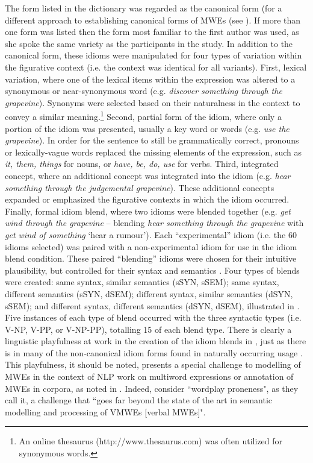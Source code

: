 \documentclass[output=paper
,modfonts
,nonflat]{langsci/langscibook}
\begin{document}
The form listed in the dictionary was regarded as the canonical form (for a different approach to establishing canonical forms of MWEs (see ). If more than one form was listed then the form most familiar to the first author was used, as she spoke the same variety as the participants in the study. In addition to the canonical form, these idioms were manipulated for four types of variation within the figurative context (i.e. the context was identical for all variants). First, lexical variation, where one of the lexical items within the expression was altered to a synonymous or near-synonymous word (e.g. \textit{discover something through the grapevine}). Synonyms were selected based on their naturalness in the context to convey a similar meaning.\footnote{An online thesaurus (http://www.thesaurus.com) was often utilized for synonymous words.} Second, partial form of the idiom, where only a portion of the idiom was presented, usually a key word or words (e.g. \textit{use the grapevine}). In order for the sentence to still be grammatically correct, pronouns or lexically-vague words replaced the missing elements of the expression, such as \textit{it, them, things} for nouns, or \textit{have, be, do, use} for verbs. Third, integrated concept, where an additional concept was integrated into the idiom (e.g. \textit{hear something through the judgemental grapevine}). These additional concepts expanded or emphasized the figurative contexts in which the idiom occurred. Finally, formal idiom blend, where two idioms were blended together (e.g. \textit{get wind through the grapevine} -- blending \textit{hear something through the grapevine} with \textit{get wind of something} `hear a rumour'). Each ``experimental'' idiom (i.e. the 60 idioms selected) was paired with a non-experimental idiom for use in the idiom blend condition. These paired ``blending'' idioms were chosen for their intuitive plausibility, but controlled for their syntax and semantics \citep{CuttingBock1997}. Four types of blends were created: same syntax, similar semantics (sSYN, sSEM); same syntax, different semantics (sSYN, dSEM); different syntax, similar semantics (dSYN, sSEM); and different syntax, different semantics (dSYN, dSEM), illustrated in . Five instances of each type of blend occurred with the three syntactic types (i.e. V-NP, V-PP, or V-NP-PP), totalling 15 of each blend type. There is clearly a linguistic playfulness at work in the creation of the idiom blends in , just as there is in many of the non-canonical idiom forms found in naturally occurring usage \citep[cf.][]{Moon1998,Duffley2013}. This playfulness, it should be noted, presents a special challenge to modelling of MWEs in the context of NLP work on multiword expressions or annotation of MWEs in corpora, as noted in . Indeed,  consider ``wordplay proneness", as they call it, a challenge that ``goes far beyond the state of the art in semantic modelling and processing of VMWEs [verbal MWEs]".
\end{document}
